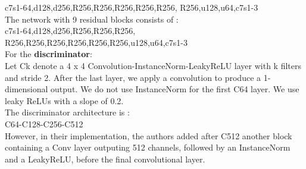 \documentclass[twocolumn,superscriptaddress,aps,floatfix,nofootinbib]{revtex4-1}
\begin{document}
    c7s1-64,d128,d256,R256,R256,R256,R256,R256,
    R256,u128,u64,c7s1-3\\
    
    The network with 9 residual blocks consists of :\\
    
    c7s1-64,d128,d256,R256,R256,R256,
    R256,R256,R256,R256,R256,R256,u128,u64,c7s1-3\\
    
    For the \textbf{discriminator}:\\
    
    Let Ck denote a 4 x 4 Convolution-InstanceNorm-LeakyReLU layer with k filters and stride 2. After the last layer, we apply a convolution to produce a 1-dimensional output. We do not use InstanceNorm for the first C64 layer. We use leaky ReLUs with a slope of 0.2.\\
    
    The discriminator architecture is :\\
    
    C64-C128-C256-C512\\
    
    However, in their implementation, the authors added after C512 another block containing a Conv layer outputing 512 channels, followed by an InstanceNorm and a LeakyReLU, before the final convolutional layer.
    
    
    
    \newpage
    
    
    
    \nocite{*}
\end{document}
